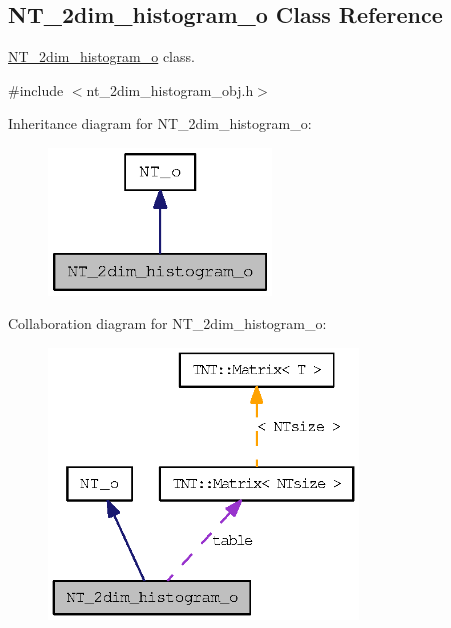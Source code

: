 \subsection{NT\_\-2dim\_\-histogram\_\-o Class Reference}
\label{class_n_t__2dim__histogram__o}


\hyperlink{class_n_t__2dim__histogram__o}{NT\_\-2dim\_\-histogram\_\-o} class.  




{\ttfamily \#include $<$nt\_\-2dim\_\-histogram\_\-obj.h$>$}



Inheritance diagram for NT\_\-2dim\_\-histogram\_\-o:
\nopagebreak
\begin{figure}[H]
\begin{center}
\leavevmode
\includegraphics[width=168pt]{class_n_t__2dim__histogram__o__inherit__graph}
\end{center}
\end{figure}


Collaboration diagram for NT\_\-2dim\_\-histogram\_\-o:
\nopagebreak
\begin{figure}[H]
\begin{center}
\leavevmode
\includegraphics[width=233pt]{class_n_t__2dim__histogram__o__coll__graph}
\end{center}
\end{figure}
